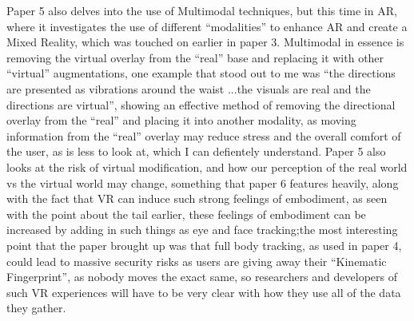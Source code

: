 \documentclass{scrartcl}
\begin{document}
Paper 5 \cite{rosa2016re} also delves into the use of Multimodal techniques, but this time in AR, where it investigates the use of different ``modalities'' to enhance AR and create a Mixed Reality, which was touched on earlier in paper 3. Multimodal in essence is removing the virtual overlay from the ``real'' base and replacing it with other ``virtual'' augmentations, one example that stood out to me was ``the directions are presented as vibrations around the waist ...the visuals are real and the directions are virtual''\cite{rosa2016re}, showing an effective method of removing the directional overlay from the ``real'' and placing it into another modality, as moving information from the ``real'' overlay may reduce stress and the overall comfort of the user, as is less to look at, which I can defientely understand. Paper 5 also looks at the risk of virtual modification, and how our perception of the real world vs the virtual world may change, something that paper 6\cite{madary2016real} features heavily, along with the fact that VR can induce such strong feelings of embodiment, as seen with the point about the tail earlier, these feelings of embodiment can be increased by adding in such things as eye and face tracking\cite{collingwoode2017effect};the most interesting point that the paper brought up was that full body tracking, as used in paper 4, could lead to massive security risks as users are giving away their ``Kinematic Fingerprint'', as nobody moves the exact same, so researchers and developers of such VR experiences will have to be very clear with how they use all of the data they gather. 







\noindent 




\raggedright


\end{document}
